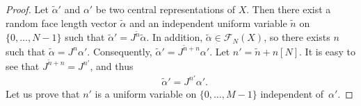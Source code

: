\documentclass[numbers,compress,v1.0.1]{vmsta}
\theoremstyle{definition}
\begin{document}
\begin{proof}
Let $\tilde{\alpha}'$ and $\alpha'$ be two central representations of
$X$. Then there exist a random face length vector $\tilde{\alpha}$ and
an independent uniform variable $\tilde{n}$ on $\lbrace0,\dots
,N-1\rbrace$ such that $\tilde{\alpha}'=J^{\tilde{n}}\tilde{\alpha}$.
In addition, $\tilde{\alpha}\in\mathcal{F}_{N}(X)$, so there exists $n$
such that $\tilde{\alpha}=J^{n}\alpha'$. Consequently, $\tilde{\alpha
}'=J^{\tilde{n}+n}\alpha'$. Let $n'=\tilde{n}+n[N]$. It is easy to see
that $ J^{\tilde{n}+n}=J^{n'}$, and thus
%
\begin{align*}
&\tilde{\alpha}'=J^{n'}\alpha'.
\end{align*}
%
Let us prove that $n'$ is a uniform variable on $\lbrace0,\dots
,M-1\rbrace$ independent of~$\alpha'$.


\end{proof}
\end{document}
